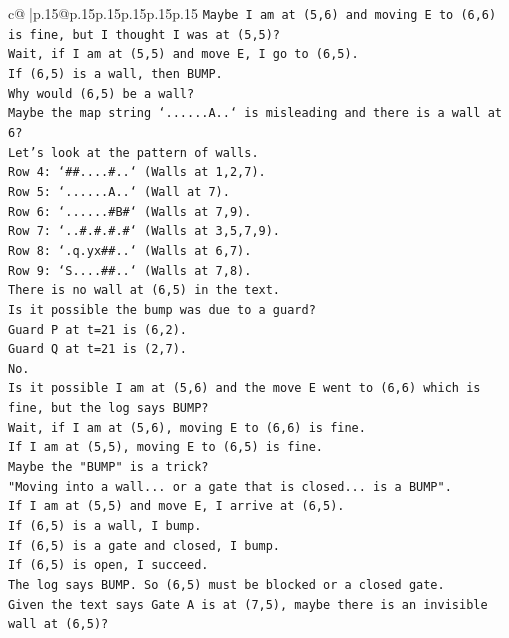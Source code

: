 \documentclass{article}
\begin{document}
{\begin{supertabular}{c@{$\;$}|p{.15\linewidth}@{}p{.15\linewidth}p{.15\linewidth}p{.15\linewidth}p{.15\linewidth}p{.15\linewidth}}
{{{\texttt{Maybe I am at (5,6) and moving E to (6,6) is fine, but I thought I was at (5,5)?} \\
\texttt{Wait, if I am at (5,5) and move E, I go to (6,5).} \\
\texttt{If (6,5) is a wall, then BUMP.} \\
\texttt{Why would (6,5) be a wall?} \\
\texttt{Maybe the map string `......A..` is misleading and there is a wall at 6?} \\
\texttt{Let's look at the pattern of walls.} \\
\texttt{Row 4: `\#\#....\#..` (Walls at 1,2,7).} \\
\texttt{Row 5: `......A..` (Wall at 7).} \\
\texttt{Row 6: `......\#B\#` (Walls at 7,9).} \\
\texttt{Row 7: `..\#.\#.\#.\#` (Walls at 3,5,7,9).} \\
\texttt{Row 8: `.q.yx\#\#..` (Walls at 6,7).} \\
\texttt{Row 9: `S....\#\#..` (Walls at 7,8).} \\
\texttt{There is no wall at (6,5) in the text.} \\
\texttt{Is it possible the bump was due to a guard?} \\
\texttt{Guard P at t=21 is (6,2).} \\
\texttt{Guard Q at t=21 is (2,7).} \\
\texttt{No.} \\
\texttt{Is it possible I am at (5,6) and the move E went to (6,6) which is fine, but the log says BUMP?} \\
\texttt{Wait, if I am at (5,6), moving E to (6,6) is fine.} \\
\texttt{If I am at (5,5), moving E to (6,5) is fine.} \\
\texttt{Maybe the "BUMP" is a trick?} \\
\texttt{"Moving into a wall... or a gate that is closed... is a BUMP".} \\
\texttt{If I am at (5,5) and move E, I arrive at (6,5).} \\
\texttt{If (6,5) is a wall, I bump.} \\
\texttt{If (6,5) is a gate and closed, I bump.} \\
\texttt{If (6,5) is open, I succeed.} \\
\texttt{The log says BUMP. So (6,5) must be blocked or a closed gate.} \\
\texttt{Given the text says Gate A is at (7,5), maybe there is an invisible wall at (6,5)?} \\
}}}
\end{supertabular}}
\end{document}
